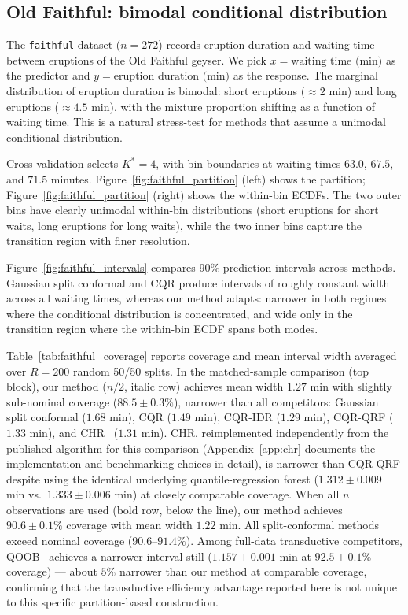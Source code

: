 \documentclass[11pt]{article}
\begin{document}
\subsection{Old Faithful: bimodal conditional distribution}

The \texttt{faithful} dataset ($n = 272$) records eruption duration and
waiting time between eruptions of the Old Faithful geyser.
We pick $x = \text{waiting time (min)}$ as the predictor and
$y = \text{eruption duration (min)}$ as the response.
The marginal distribution of eruption duration is bimodal:
short eruptions ($\approx 2$ min) and long eruptions ($\approx 4.5$ min),
with the mixture proportion shifting as a function of waiting time.
This is a natural stress-test for methods that assume a unimodal conditional distribution.

Cross-validation selects $K^* = 4$, with bin boundaries at
waiting times $63.0$, $67.5$, and $71.5$ minutes.
Figure~\ref{fig:faithful_partition} (left) shows the partition;
Figure~\ref{fig:faithful_partition} (right) shows the within-bin ECDFs.
The two outer bins have clearly unimodal within-bin distributions (short
eruptions for short waits, long eruptions for long waits), while the two
inner bins capture the transition region with finer resolution.

Figure~\ref{fig:faithful_intervals} compares 90\% prediction intervals across
methods.
Gaussian split conformal and CQR produce intervals of roughly constant width
across all waiting times, whereas our method adapts: narrower in both
regimes where the conditional distribution is concentrated, and wide only in
the transition region where the within-bin ECDF spans both modes.

Table~\ref{tab:faithful_coverage} reports coverage and mean interval width
averaged over $R=200$ random 50/50 splits.
In the matched-sample comparison (top block), our method ($n/2$, italic row)
achieves mean width $1.27$ min with slightly sub-nominal coverage
($88.5 \pm 0.3\%$), narrower than all competitors: Gaussian split conformal
($1.68$ min), CQR ($1.49$ min), CQR-IDR ($1.29$ min), CQR-QRF ($1.33$ min), and
CHR~\citep{SesiaRomano2021} ($1.31$ min).
CHR, reimplemented independently from the published algorithm for this comparison
(Appendix~\ref{app:chr} documents the implementation and benchmarking choices in
detail), is narrower than CQR-QRF despite using the identical underlying
quantile-regression forest ($1.312 \pm 0.009$ min vs.\ $1.333 \pm 0.006$ min) at
closely comparable coverage.
When all $n$ observations are used (bold row, below the line), our method achieves
$90.6 \pm 0.1\%$ coverage with mean width $1.22$ min.
All split-conformal methods exceed nominal coverage ($90.6$--$91.4\%$).
Among full-data transductive competitors, QOOB~\citep{GuptaEtAl2022} achieves a
narrower interval still ($1.157 \pm 0.001$ min at $92.5 \pm 0.1\%$ coverage) ---
about $5\%$ narrower than our method at comparable coverage, confirming that the
transductive efficiency advantage reported here is not unique to this specific
partition-based construction.
\end{document}
